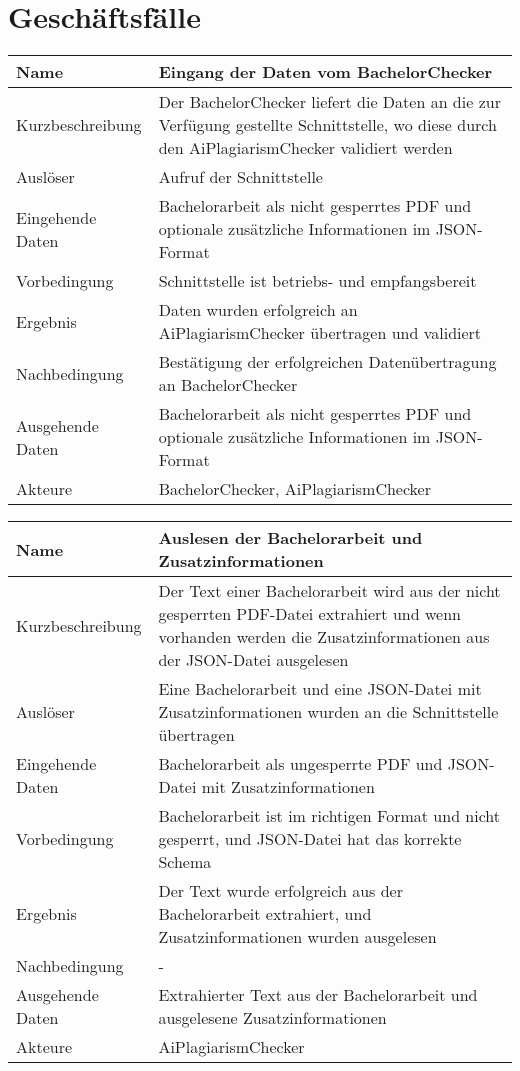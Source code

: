 \chapter{Geschäftsfälle}\label{ch:geschaftsfaelle}

\begin{tabularx}{\textwidth}{|l|X|}
    \hline
    \textbf{Name} & \textbf{Eingang der Daten vom BachelorChecker} \\
    \hline
    Kurzbeschreibung & Der BachelorChecker liefert die Daten an die zur Verfügung gestellte Schnittstelle, wo diese durch den AiPlagiarismChecker validiert werden \\
    \hline
    Auslöser & Aufruf der Schnittstelle \\
    \hline
    Eingehende Daten & Bachelorarbeit als nicht gesperrtes PDF und optionale zusätzliche Informationen im JSON-Format \\
    \hline
    Vorbedingung & Schnittstelle ist betriebs- und empfangsbereit \\
    \hline
    Ergebnis & Daten wurden erfolgreich an AiPlagiarismChecker übertragen und validiert \\
    \hline
    Nachbedingung & Bestätigung der erfolgreichen Datenübertragung an BachelorChecker \\
    \hline
    Ausgehende Daten & Bachelorarbeit als nicht gesperrtes PDF und optionale zusätzliche Informationen im JSON-Format \\
    \hline
    Akteure & BachelorChecker, AiPlagiarismChecker \\
    \hline
\end{tabularx}

\begin{tabularx}{\textwidth}{|l|X|}
    \hline
    \textbf{Name} & \textbf{Auslesen der Bachelorarbeit und Zusatzinformationen} \\
    \hline
    Kurzbeschreibung & Der Text einer Bachelorarbeit wird aus der nicht gesperrten PDF-Datei extrahiert und wenn vorhanden werden die Zusatzinformationen aus der JSON-Datei ausgelesen \\
    \hline
    Auslöser & Eine Bachelorarbeit und eine JSON-Datei mit Zusatzinformationen wurden an die Schnittstelle übertragen \\
    \hline
    Eingehende Daten & Bachelorarbeit als ungesperrte PDF und JSON-Datei mit Zusatzinformationen\\
    \hline
    Vorbedingung & Bachelorarbeit ist im richtigen Format und nicht gesperrt, und JSON-Datei hat das korrekte Schema \\
    \hline
    Ergebnis & Der Text wurde erfolgreich aus der Bachelorarbeit extrahiert, und Zusatzinformationen wurden ausgelesen \\
    \hline
    Nachbedingung & - \\
    \hline
    Ausgehende Daten & Extrahierter Text aus der Bachelorarbeit und ausgelesene Zusatzinformationen \\
    \hline
    Akteure & AiPlagiarismChecker \\
    \hline
\end{tabularx}


